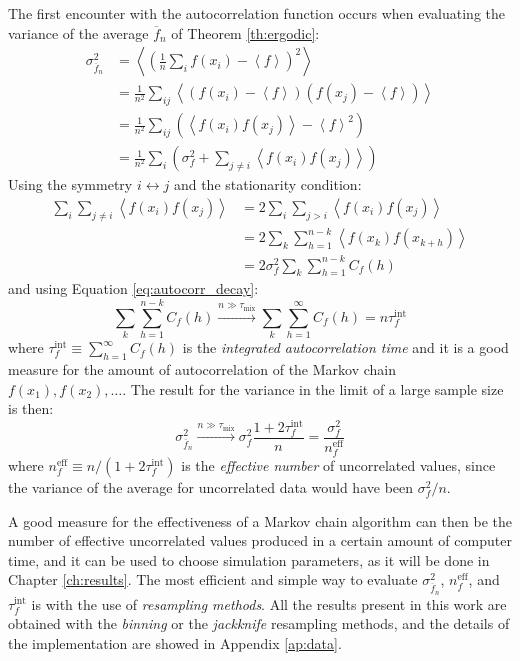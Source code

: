 The first encounter with the autocorrelation function occurs when evaluating the variance of the average $\overline f_n$ of Theorem \ref{th:ergodic}:
\begin{align*}
    \sigma_{\overline f_n}^2 &= \left<\left(\frac{1}{n}\sum_if(x_i) - \left<f\right>\right)^2\right> \\
                             &= \frac{1}{n^2}\sum_{ij}\left<(f(x_i)-\left<f\right>)(f(x_j)-\left<f\right>)\right> \\
                             &= \frac{1}{n^2}\sum_{ij}\left(\left<f(x_i)f(x_j)\right>-\left<f\right>^2\right) \\
                             &= \frac{1}{n^2}\sum_i\left(\sigma_f^2+\sum_{j \neq i}\left<f(x_i)f(x_j)\right>\right)
\end{align*}
Using the symmetry $i \leftrightarrow j$ and the stationarity condition:
\begin{align*}
    \sum_i\sum_{j\neq i}\left<f(x_i)f(x_j)\right> &= 2\sum_i\sum_{j>i}\left<f(x_i)f(x_j)\right> \\
                                                  &= 2\sum_k\sum_{h=1}^{n-k}\left<f(x_k)f(x_{k+h})\right> \\
                                                  &= 2\sigma_f^2\sum_k\sum_{h=1}^{n-k}C_f(h)
\end{align*}
and using Equation \ref{eq:autocorr_decay}:
\[
    \sum_k\sum_{h=1}^{n-k}C_f(h) \xrightarrow{n\gg\tau_\mathrm{mix}} \sum_k\sum_{h=1}^\infty C_f(h) = n\tau_f^\mathrm{int}
\]
where $\tau_f^\mathrm{int} \equiv \sum_{h=1}^\infty C_f(h)$ is the \emph{integrated autocorrelation time} and
it is a good measure for the amount of autocorrelation of the Markov chain $f(x_1), f(x_2), \ldots$.
The result for the variance in the limit of a large sample size is then:
\begin{equation}\label{eq:variance}
    \sigma_{\overline f_n}^2 \xrightarrow{n\gg\tau_\mathrm{mix}} \sigma_f^2\frac{1+2\tau_f^\mathrm{int}}{n}
                             = \frac{\sigma_f^2}{n_f^\mathrm{eff}}
\end{equation}
where $n_f^\mathrm{eff} \equiv n/(1+2\tau_f^\mathrm{int})$ is the \emph{effective number} of uncorrelated values,
since the variance of the average for uncorrelated data would have been $\sigma_f^2/n$.

A good measure for the effectiveness of a Markov chain algorithm can then be the number of effective uncorrelated values produced in a certain amount of computer time,
and it can be used to choose simulation parameters, as it will be done in Chapter \ref{ch:results}.
The most efficient and simple way to evaluate $\sigma_{\overline f_n}^2$, $n_f^\mathrm{eff}$, and $\tau_f^\mathrm{int}$ is with the use of \emph{resampling methods}.
All the results present in this work are obtained with the \emph{binning} or the \emph{jackknife} resampling methods,
and the details of the implementation are showed in Appendix \ref{ap:data}.

